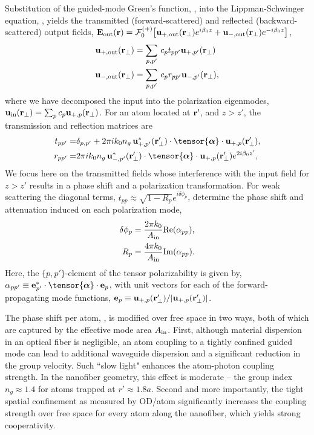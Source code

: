 \documentclass[aps,pra,twocolumn]{revtex4-1} %
\newcommand{\out}{{\rm out}}
\newcommand{\fwd}{+}
\newcommand{\bwd}{-}
\newcommand{\trans}{+}
\newcommand{\refl}{-}
\newcommand{\Eamp}{\mathcal{F}_0^{(+)}}
\begin{document}
Substitution of the guided-mode Green's function, , into the Lippman-Schwinger equation, , yields the transmitted (forward-scattered) and reflected (backward-scattered) output fields, $\mathbf{E}_{\out}(\br) = \Eamp \big[ \mathbf{u}_{\trans, \out} (\br_\perp) e^{i \beta_0 z} + \mathbf{u}_{\refl,\out} (\br_\perp) e^{-i \beta_0 z} \big]$, 
	\begin{align}
		\mathbf{u}_{\trans, \out} (\br_\perp) &=  \sum_{p,p'}  \, c_{p} t_{pp'} \mathbf{u}_{\fwd, p'}(\br_\perp) \\ 
		\mathbf{u}_{\refl,\out} (\br_\perp) &=  \sum_{p,p'}  \, c_{p} r_{pp'} \mathbf{u}_{\bwd, p'}(\br_\perp),
	\end{align}
where we have decomposed the input into the polarization eigenmodes, $\mbf{u}_{\rm in}(\mbf{r}_\perp) = \sum_{p} c_{p} \mathbf{u}_{\fwd,p}(\br_\perp)$.  
For an atom located at $\mathbf{r}'$, and $z>z'$, the transmission and reflection matrices are 
	\begin{align} \label{Eq::PolarizationTransformation}
		t_{pp'} =& \delta_{p,p'} +  2\pi i k_0 n_g \, \mathbf{u}^*_{+, p'}(\br'_\perp) \cdot 
\tensor{\boldsymbol{\alpha}} \cdot \mathbf{u}_{+, p}(\br'_\perp) , \\
		r_{pp'} =&  2\pi i k_0 n_g \, \mathbf{u}^*_{\bwd, p'}(\br'_\perp) \cdot 
\tensor{\boldsymbol{\alpha}} \cdot \mathbf{u}_{\fwd, p}(\br'_\perp) e^{2 i\beta_0 z'} , 
	\end{align} 
We focus here on the transmitted fields whose interference with the input field for $z>z'$ results in a phase shift and a polarization transformation.  
For weak scattering the diagonal terms, $t_{p p} \approx \sqrt{1-R_p}e^{i \delta \phi_p}$, determine the phase shift and attenuation induced on each polarization mode,
	\begin{align}
		 \delta \phi_p &= \frac{2 \pi k_0}{A_{\rm in}} {\rm Re}(\alpha_{pp}),  \label{Eq::PhaseShift} \\
		R_p &=  \frac{4 \pi k_0}{A_{\rm in}} {\rm Im}(\alpha_{pp}) .\label{Eq::Attenuation} 
	\end{align} 
Here, the $\{p,p'\}$-element of the tensor polarizability is given by, $\alpha_{pp'} \equiv \mathbf{e}^*_{p'} \cdot \tensor{\boldsymbol{\alpha}}\cdot \mathbf{e}_{p}$, with unit vectors for each of the forward-propagating mode functions, $\mathbf{e}_{p}\equiv \mathbf{u}_{+,p}(\mathbf{r}'_\perp)/|\mathbf{u}_{+,p}(\mathbf{r}'_\perp)|$. 

The phase shift per atom, , is modified over free space in two ways, both of which are captured by the effective mode area $A_{\rm in}$. 
First, although material dispersion in an optical fiber is negligible, an atom coupling to a tightly confined guided mode can lead to additional waveguide dispersion and a significant reduction in the group velocity.  
Such ``slow light" enhances the atom-photon coupling strength. 
In the nanofiber geometry, this effect is moderate -- the group index $n_g \approx 1.4$ for atoms trapped at $r' \approx1.8 a$. 
Second and more importantly, the tight spatial confinement as measured by OD/atom significantly increases the coupling strength over free space for every atom along the nanofiber, which yields strong cooperativity.
\end{document}
